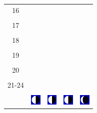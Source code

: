 \documentclass[twoside, a4paper,12pt, tikz]{scrartcl}
\begin{document}
\begin{tabularx}{\linewidth}{|c|X|X|p{2cm}|p{2cm}|}
            &   &       &    &   \\
          \hline
          16&   &                 &    &   \\
            &   &       &    &   \\
          \hline
          17&   &                 &    &   \\
            &   &       &    &   \\
          \hline
          18&   &                 &    &   \\
            &   &       &    &   \\
          \hline
          19&   &                 &     &   \\
            &   &       &    &   \\
          \hline
          20&   &              &    &   \\
            &   &       &    &   \\
          \hline 
          21-24&   &              &    &   \\
            &   &       &    &   \\
          \hline
                      & \vspace{0.01cm} \centerline{\includegraphics[width=0.5cm]{moon_phases/Moon_phase_6.svg.png}} \vspace{0.1cm} & \vspace{0.01cm} \centerline{\includegraphics[width=0.5cm]{moon_phases/Moon_phase_6.svg.png}} \vspace{0.1cm} & \vspace{0.01cm} \centerline{\includegraphics[width=0.5cm]{moon_phases/Moon_phase_6.svg.png}} \vspace{0.1cm} & \vspace{0.01cm} \centerline{\includegraphics[width=0.5cm]{moon_phases/Moon_phase_7.svg.png}} \vspace{0.1cm}\\
          \hline    
        \end{tabularx}
\end{document}
